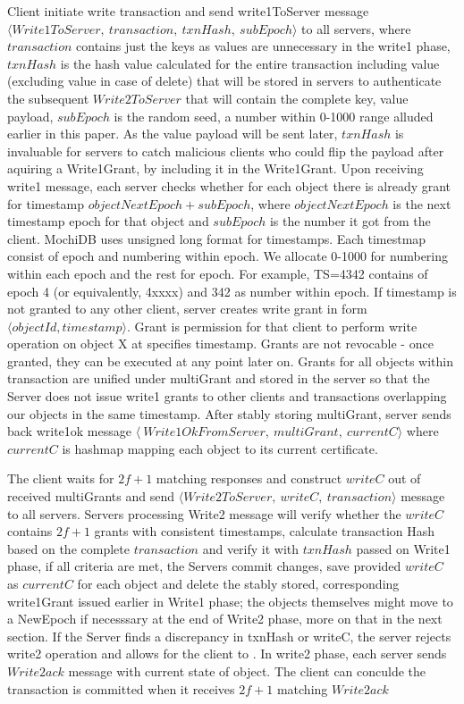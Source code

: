 \documentclass[letterpaper,twocolumn,10pt]{article}
\begin{document}
Client initiate write transaction and send write1ToServer message $\langle Write1ToServer,\ transaction,\ txnHash,\ subEpoch \rangle$ to all servers, where $transaction$ contains just the keys as values are unnecessary in the write1 phase, $txnHash$ is the hash value calculated for the entire transaction including value (excluding value in case of delete) that will be stored in servers to authenticate the subsequent $Write2ToServer$ that will contain the complete key, value payload, $subEpoch$ is the random seed, a number within 0-1000 range alluded earlier in this paper. As the value payload will be sent later, $txnHash$ is invaluable for servers to catch malicious clients who could flip the payload after aquiring a Write1Grant, by including it in the Write1Grant. Upon receiving write1 message, each server checks whether for each object there is already grant for timestamp $objectNextEpoch + subEpoch$, where $objectNextEpoch$ is the next timestamp epoch for that object and $subEpoch$ is the number it got from the client. MochiDB uses unsigned long format for timestamps. Each timestmap consist of epoch and numbering within epoch. We allocate 0-1000 for numbering within each epoch and the rest for epoch. For example, TS=4342 contains of epoch 4 (or equivalently, 4xxxx) and 342 as number within epoch. If timestamp is not granted to any other client, server creates write grant in form $\langle objectId, timestamp \rangle$. Grant is permission for that client to perform write operation on object X at specifies timestamp. Grants are not revocable - once granted, they can be executed at any point later on. Grants for all objects within transaction are unified under multiGrant and stored in the server so that the Server does not issue write1 grants to other clients and transactions overlapping our objects in the same timestamp. After stably storing multiGrant, server sends back write1ok message $\langle\ Write1OkFromServer,\ multiGrant,\ currentC \rangle$ where $currentC$ is hashmap mapping each object to its current certificate.

The client waits for $2f+1$ matching responses and construct $writeC$ out of received multiGrants and send $\langle Write2ToServer,\ writeC,\ transaction \rangle$ message to all servers. Servers processing Write2 message will verify whether the $writeC$ contains $2f+1$ grants with consistent timestamps, calculate transaction Hash based on the complete $transaction$ and verify it with $txnHash$ passed on Write1 phase, if all criteria are met, the Servers commit changes, save provided $writeC$ as $currentC$ for each object and delete the stably stored, corresponding write1Grant issued earlier in Write1 phase; the objects themselves might move to a NewEpoch if necesssary at the end of Write2 phase, more on that in the next section. If the Server finds a discrepancy in txnHash or writeC, the server rejects write2 operation and allows for the client to . In write2 phase, each server sends $Write2ack$ message with current state of object. The client can conculde the transaction is committed when it receives $2f+1$ matching $Write2ack$
\end{document}
